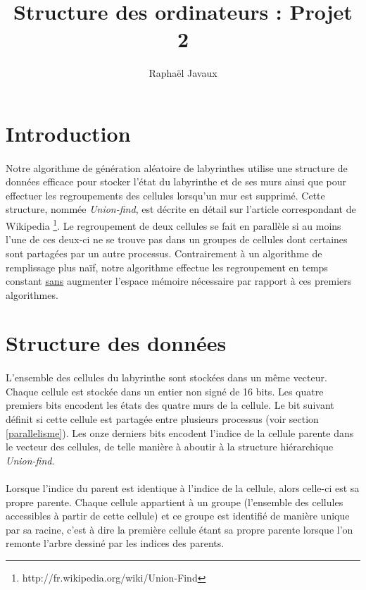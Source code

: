 \documentclass[a4paper,french]{article}
\title{Structure des ordinateurs : Projet 2}
\author{Raphaël Javaux}
\date{}
\begin{document}
\maketitle

\section{Introduction}

    \paragraph{} Notre algorithme de génération aléatoire de labyrinthes utilise
une structure de données efficace pour stocker l'état du labyrinthe et de ses
murs ainsi que pour effectuer les regroupements des cellules lorsqu'un mur est
supprimé.
    \newline Cette structure, nommée \textit{Union-find}, est décrite en détail
sur l'article correspondant de Wikipedia
\footnote{http://fr.wikipedia.org/wiki/Union-Find}. Le regroupement de deux
cellules se fait en parallèle si au moins l'une de ces deux-ci ne se trouve pas
dans un groupes de cellules dont certaines sont partagées par un autre
processus.
    \newline Contrairement à un algorithme de remplissage plus naïf, notre
algorithme effectue les regroupement en temps constant \underline{sans}
augmenter l'espace mémoire nécessaire par rapport à ces premiers algorithmes.

\section{Structure des données}
\label{donnees}

    \paragraph{} L'ensemble des cellules du labyrinthe sont stockées dans un
même vecteur.
    \newline Chaque cellule est stockée dans un entier non signé de 16 bits. Les
quatre premiers bits encodent les états des quatre murs de la cellule. Le bit
suivant définit si cette cellule est partagée entre plusieurs processus (voir
section \ref{parallelisme}). Les onze derniers bits encodent l'indice de la
cellule parente dans le vecteur des cellules, de telle manière à aboutir à la
structure hiérarchique \textit{Union-find}.

    \paragraph{} Lorsque l'indice du parent est identique à l'indice de la
cellule, alors celle-ci est sa propre parente.
    \newline Chaque cellule appartient à un groupe (l'ensemble des cellules
accessibles à partir de cette cellule) et ce groupe est identifié de manière
unique par sa racine, c'est à dire la première cellule étant sa propre parente
lorsque l'on remonte l'arbre dessiné par les indices des parents.
\end{document}
